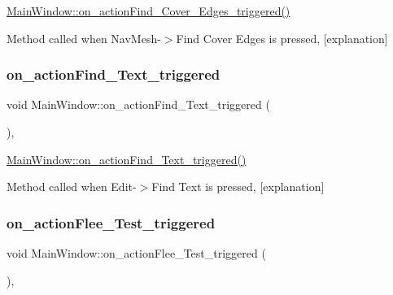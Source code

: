 \hyperlink{class_main_window_a23fdbcb0c33b6f6327cffa6d2debf1ed}{Main\+Window\+::on\+\_\+action\+Find\+\_\+\+Cover\+\_\+\+Edges\+\_\+triggered()} 

Method called when Nav\+Mesh-\/$>$Find Cover Edges is pressed, \mbox{[}explanation\mbox{]} \mbox{\label{class_main_window_a83f715fceb4ae6b29bc3dbf86260b580}} 
\subsubsection{\texorpdfstring{on\+\_\+action\+Find\+\_\+\+Text\+\_\+triggered}{on\_actionFind\_Text\_triggered}}
{\footnotesize\ttfamily void Main\+Window\+::on\+\_\+action\+Find\+\_\+\+Text\+\_\+triggered (\begin{DoxyParamCaption}{ }\end{DoxyParamCaption})\hspace{0.3cm}{\ttfamily [private]}, {\ttfamily [slot]}}



\hyperlink{class_main_window_a83f715fceb4ae6b29bc3dbf86260b580}{Main\+Window\+::on\+\_\+action\+Find\+\_\+\+Text\+\_\+triggered()} 

Method called when Edit-\/$>$Find Text is pressed, \mbox{[}explanation\mbox{]} \mbox{\label{class_main_window_aa7c4d3fb11b9a0b3e4913e83c2a141c4}} 
\subsubsection{\texorpdfstring{on\+\_\+action\+Flee\+\_\+\+Test\+\_\+triggered}{on\_actionFlee\_Test\_triggered}}
{\footnotesize\ttfamily void Main\+Window\+::on\+\_\+action\+Flee\+\_\+\+Test\+\_\+triggered (\begin{DoxyParamCaption}{ }\end{DoxyParamCaption})\hspace{0.3cm}{\ttfamily [private]}, {\ttfamily [slot]}}



